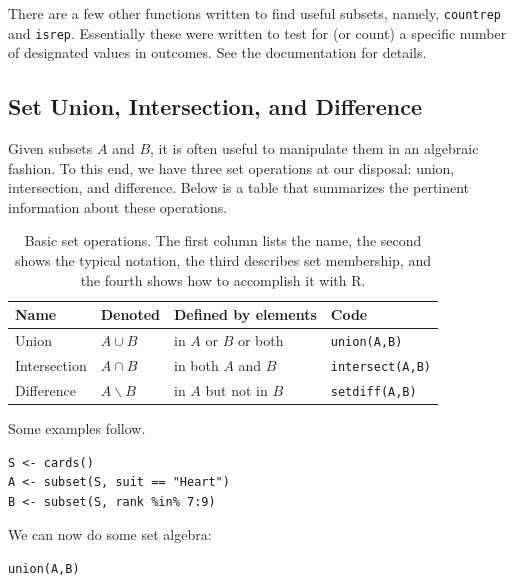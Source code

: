 \documentclass[captions=tableheading]{scrbook}
\begin{document}
There are a few other functions written to find useful subsets, namely, \texttt{countrep} and \texttt{isrep}. Essentially these were written to test for (or count) a specific number of designated values in outcomes. See the documentation for details.
\subsection{Set Union, Intersection, and Difference}
\label{sec-4-2-3}


Given subsets \(A\) and \(B\), it is often useful to manipulate them in an algebraic fashion. To this end, we have three set operations at our disposal: union, intersection, and difference. Below is a table that summarizes the pertinent information about these operations.

\begin{table}[htb]
\caption[Set operations]{Basic set operations.  The first column lists the name, the second shows the typical notation, the third describes set membership, and the fourth shows how to accomplish it with R.} \label{exa-sample-urn-two-from-three}
\begin{center}
\begin{tabular}{llll}
\hline
 Name          &  Denoted            &  Defined by elements        &  Code                     \\
\hline
 Union         &  \(A\cup B\)        &  in \(A\) or \(B\) or both  &  \texttt{union(A,B)}      \\
 Intersection  &  \(A\cap B\)        &  in both \(A\) and \(B\)    &  \texttt{intersect(A,B)}  \\
 Difference    &  \(A\backslash B\)  &  in \(A\) but not in \(B\)  &  \texttt{setdiff(A,B)}    \\
\hline
\end{tabular}
\end{center}
\end{table}



Some examples follow. 


\lstset{language=R}
\begin{lstlisting}
S <- cards() 
A <- subset(S, suit == "Heart") 
B <- subset(S, rank %in% 7:9)
\end{lstlisting}

We can now do some set algebra: 


\lstset{language=R}
\begin{lstlisting}
union(A,B)
\end{lstlisting}
\end{document}
